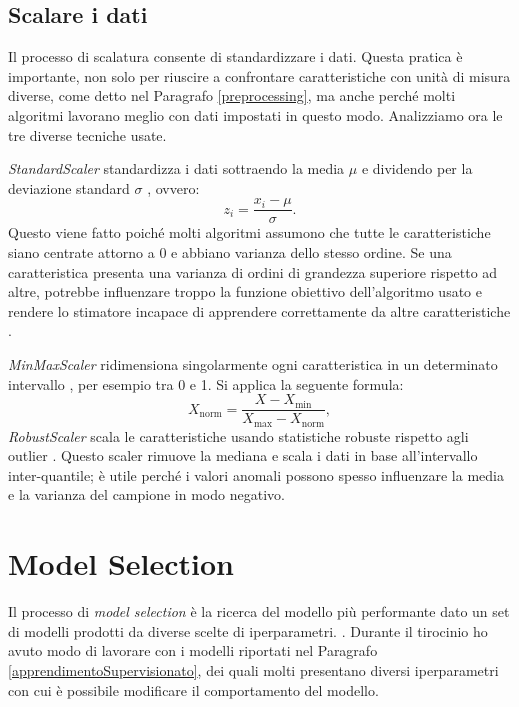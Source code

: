 \documentclass[12pt,italian]{report}
\begin{document}
\subsection{Scalare i dati}
Il processo di scalatura consente di standardizzare i dati. Questa pratica è importante, non solo per riuscire a confrontare caratteristiche con unità di misura diverse, come detto nel Paragrafo \ref{preprocessing}, ma anche perché molti algoritmi lavorano meglio con dati impostati in questo modo.  
Analizziamo ora le tre diverse tecniche usate.

\emph{StandardScaler} standardizza i dati sottraendo la media $\mu$ e dividendo per la deviazione standard $\sigma$ \cite{scikit-learn}, ovvero:
\begin{equation}
z_i = \frac{x_i - \mu}{\sigma}.
\end{equation}
Questo viene fatto poiché molti algoritmi assumono che tutte le caratteristiche siano centrate attorno a 0 e abbiano varianza dello stesso ordine. Se una caratteristica presenta una varianza di ordini di grandezza superiore rispetto ad altre, potrebbe influenzare troppo la funzione obiettivo dell'algoritmo usato e rendere lo stimatore incapace di apprendere correttamente da altre caratteristiche \cite{scikit-learn}.

\emph{MinMaxScaler} ridimensiona singolarmente ogni caratteristica in un determinato intervallo \cite{scikit-learn}, per esempio tra 0 e 1. Si applica la seguente formula:
\begin{equation}
X_{\mathrm{norm}} = \frac{X - X_{\mathrm{min}}}{X_{\mathrm{max}} - X_{\mathrm{norm}}},
\end{equation}
\emph{RobustScaler} scala le caratteristiche usando statistiche robuste rispetto agli outlier \cite{scikit-learn}. Questo scaler rimuove la mediana e scala i dati in base all'intervallo inter-quantile; è utile perché i valori anomali possono spesso influenzare la media e la  varianza del campione in modo negativo.

\section{Model Selection}
\label{modelselection}
Il processo di \emph{model selection} è la ricerca del modello più performante dato un set di modelli prodotti da diverse scelte di iperparametri. \cite{Raschka2018ModelEM}.
Durante il tirocinio ho avuto modo di lavorare con i modelli riportati nel Paragrafo \ref{apprendimentoSupervisionato}, dei quali molti presentano diversi iperparametri con cui è possibile modificare il comportamento del modello. 
 
\end{document}
